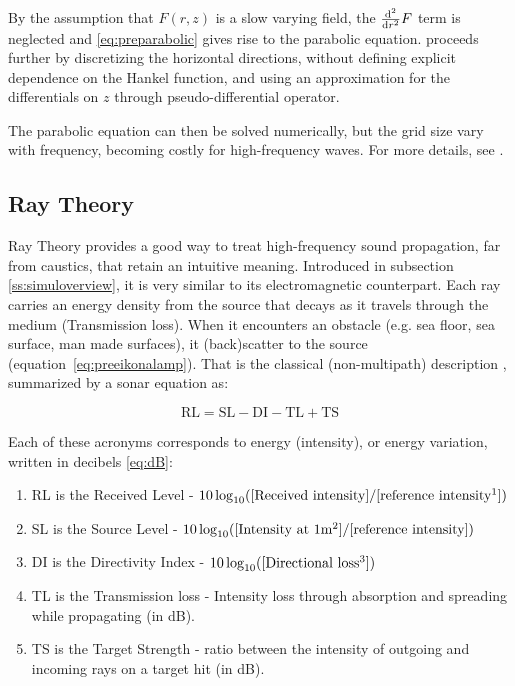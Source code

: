 By the assumption that $F(r,z)$ is a slow varying field, the $\frac{\mathrm{d^{2}}}{\mathrm{d}{r}^{2}}F$
term is neglected and \ref{eq:preparabolic} gives rise to the parabolic
equation. \citet{LURTON} proceeds further by discretizing the horizontal
directions, without defining explicit dependence on the Hankel function, and
using an approximation for the differentials on $z$ through pseudo-differential
operator.

The parabolic equation can then be solved numerically, but the grid size vary
with frequency, becoming costly for high-frequency waves. For more
details, see \citet{jensen2011computational}.

\subsection{Ray Theory}
\label{ss:raytheory}

Ray Theory provides a good way to treat high-frequency sound propagation,
far from caustics, that retain an intuitive meaning. Introduced in subsection
\ref{ss:simuloverview}, it is very similar to its electromagnetic counterpart.
Each ray carries an energy density from the source that decays as it travels
through the medium (Transmission loss). When it encounters an obstacle (e.g. sea floor, sea
surface, man made surfaces), it (back)scatter to the source
(equation~\ref{eq:preeikonalamp}). That is the
classical (non-multipath) description
\cite{LURTON,Etter2013,miller2015real,bell1997application}, summarized by a
sonar equation as:

\begin{equation}
\label{eq:sonareq}
\text{RL} = \text{SL} - \text{DI} - \text{TL} + \text{TS}
\end{equation}

Each of these acronyms corresponds to energy (intensity), or energy variation,
written in decibels \ref{eq:dB}:
\begin{enumerate}
  \item RL is the Received Level - $10\log_{10}([\text{Received
  intensity}]/[\text{reference intensity\footnotemark}])$
  \item SL is the Source Level - $10\log_{10}([\text{Intensity at
  1m\footnotemark}]/[\text{reference
  intensity}])$
  \item DI is the Directivity Index - $10\log_{10}([\text{Directional
  loss\footnotemark}])$
  \item TL is the Transmission loss - Intensity loss through absorption and
  spreading while propagating (in dB).
  \item TS is the Target Strength - ratio between the intensity of outgoing
  and incoming rays on a target hit (in dB).
\end{enumerate}




